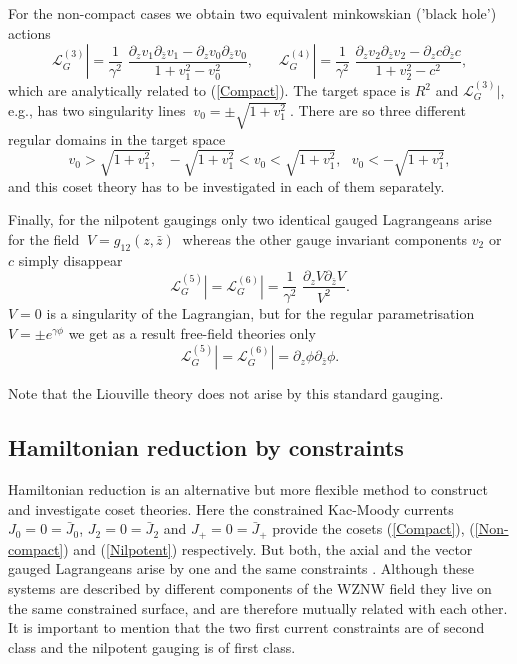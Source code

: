 \documentclass[a4paper,12]{article}
\begin{document}
For the non-compact cases we obtain two equivalent minkowskian
('black hole') actions
\begin{equation}\label{Non-compact}
{\mathcal L}_G^{(3)} |=\frac{1}{\gamma^2}\,\,
 \frac{\partial_zv_1 \partial_{\bar z}v_1 -
\partial_zv_0\partial_{\bar z}v_0}{1+v_1^2 - v_0^2},~~~~~~~~
{\mathcal L}_G^{(4)} |=\frac{1}{\gamma^2}\,\,
 \frac{\partial_zv_2 \partial_{\bar z}v_2 -
\partial_zc\partial_{\bar z}c}{1+ v_2^2-c^2 },
\end{equation}
which are analytically related to (\ref{Compact}). The target space is
$R^2$ and ${\mathcal L}_G^{(3)} |$, e.g., has two singularity lines
$~v_0=\pm\sqrt{1+v_1^2}~$. There are so three different regular
domains in the target space
\begin{equation}\label{regular}
v_0>\sqrt{1+v_1^2},~~~-\sqrt{1+v_1^2}<v_0<\sqrt{1+v_1^2},~~~ 
v_0<-\sqrt{1+v_1^2}, 
\end{equation}
and this coset theory has to be investigated in each of them separately.

Finally, for the nilpotent gaugings only two identical gauged
Lagrangeans arise for the field $~V=g_{12}(z, \bar z)~$ whereas
the other gauge invariant components $v_2$ or $c$ simply disappear 
\begin{equation}\label{Nilpotent}
{\mathcal L}_G^{(5)} |={\mathcal L}_G^{(6)} |=\frac{1}{\gamma^2}\,\,
 \frac{\partial_zV \partial_{\bar z}V}{V^2}.
\end{equation}
$V=0$ is a singularity of the Lagrangian, but for the regular parametrisation
$V=\pm e^{\gamma\phi}$ we get as a result free-field theories only
\begin{equation}\label{Free}
{\mathcal L}_G^{(5)} |={\mathcal L}_G^{(6)} |=
 \partial_z\phi \partial_{\bar z}\phi.
\end{equation}

Note that the Liouville theory does not arise by this standard
gauging.

\subsection{Hamiltonian reduction by constraints}

Hamiltonian reduction is an alternative but more flexible method to
construct and investigate coset theories. Here the constrained
Kac-Moody currents $J_0=0=\bar J_0$, $J_2=0=\bar J_2$ and $J_+=0=\bar
J_+$ provide the cosets (\ref{Compact}), (\ref{Non-compact}) and
(\ref{Nilpotent}) respectively. But both, the axial and the vector
gauged Lagrangeans arise by one and the same constraints 
\cite{FJW, FJW2}.  Although these systems are described by different
components of the WZNW field they live on the same constrained surface, and
are therefore mutually related with each other. It is important to
mention that the two first current constraints are of second class and
the nilpotent gauging is of first class.
\end{document}
